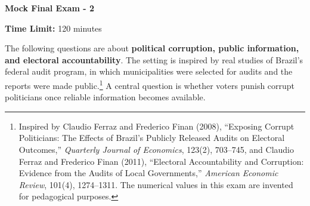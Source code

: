 \documentclass[11pt]{exam}
\newcommand{\exam}{Mock Final Exam - 2}
\begin{document}
\begin{center}

    {\Huge \textbf{\exam{}}}
    \vspace{0.7cm}

    \begin{flushright}
        \textbf{Time Limit:} 120 minutes
    \end{flushright}
    \vspace{-0.2cm}

\end{center}

\vspace{0.3cm}

The following questions are about \textbf{political corruption, public information, and electoral accountability}. The setting is inspired by real studies of Brazil's federal audit program, in which municipalities were selected for audits and the reports were made public.\footnote{Inspired by Claudio Ferraz and Frederico Finan (2008), ``Exposing Corrupt Politicians: The Effects of Brazil's Publicly Released Audits on Electoral Outcomes,'' \emph{Quarterly Journal of Economics}, 123(2), 703--745, and Claudio Ferraz and Frederico Finan (2011), ``Electoral Accountability and Corruption: Evidence from the Audits of Local Governments,'' \emph{American Economic Review}, 101(4), 1274--1311. The numerical values in this exam are invented for pedagogical purposes.}  A central question is whether voters punish corrupt politicians once reliable information becomes available.
\vspace{0.2cm}
\end{document}
